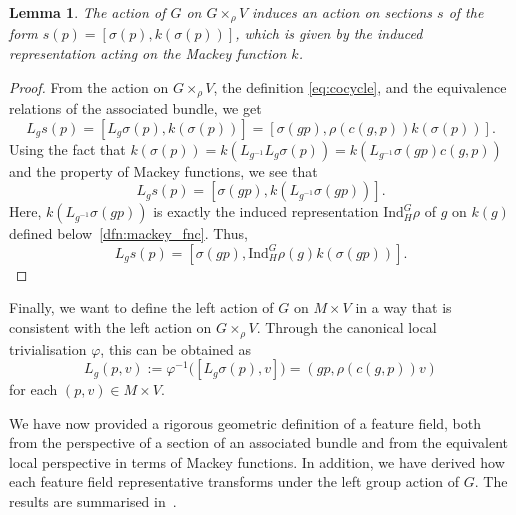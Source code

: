 \documentclass[12pt,a4paper]{article}
\numberwithin{equation}{section}
\theoremstyle{plain}
\newtheorem{lemma}[theorem]{Lemma}
\theoremstyle{definition}
\theoremstyle{remark}
\begin{document}
\begin{lemma}
    The action of $G$ on $G \times_{\rho} V$ induces an action on sections $s$ of the form $s(p)=[\sigma(p),k(\sigma(p))]$, which is given by the induced representation acting on the Mackey function $k$.
\end{lemma}
\begin{proof}
    From the action on $G \times_{\rho} V$, the definition \eqref{eq:cocycle}, and the equivalence relations of the associated bundle, we get
    \begin{equation}
        L_gs(p) = [L_g\sigma(p),k(\sigma(p))] = [\sigma(gp),\rho(c(g,p))k(\sigma(p))].
    \end{equation}
    Using the fact that $k(\sigma(p))=k(L_{g^{-1}}L_g\sigma(p))=k(L_{g^{-1}}\sigma(gp)c(g,p))$ and the property of Mackey functions, we see that
    \begin{equation}
        L_gs(p) = [\sigma(gp),k(L_{g^{-1}}\sigma(gp))].
    \end{equation}
    Here, $k(L_{g^{-1}}\sigma(gp))$ is exactly the induced representation $\mathrm{Ind}^G_H\rho$ of $g$ on $k(g)$ defined below~\cref{dfn:mackey_fnc}. Thus,
    \begin{equation}
        L_gs(p) = [\sigma(gp),\mathrm{Ind}^G_H\rho(g)k(\sigma(gp))].
    \end{equation}
\end{proof}

Finally, we want to define the left action of $G$ on $M\times V$ in a way that is consistent with the left action on $G\times_\rho V$. Through the canonical local trivialisation $\varphi$, this can be obtained as 
\begin{equation}\label{eq:left_action_on_M_times_V}
    L_g(p, v)
:= \varphi^{-1}\big([L_g \sigma(p), v]\big)
= (gp, \rho(c(g, p)) v)
\end{equation}
for each $(p,v)\in M\times V$.

We have now provided a rigorous geometric definition of a feature field, both from the perspective of a section of an associated bundle and from the equivalent local perspective in terms of Mackey functions. In addition, we have derived how each feature field representative transforms under the left group action of $G$. The results are summarised in~.
\end{document}
